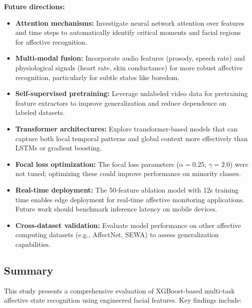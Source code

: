\textbf{Future directions:}
\begin{itemize}
    \item \textbf{Attention mechanisms:} Investigate neural network attention over features and time steps to automatically identify critical moments and facial regions for affective recognition.

    \item \textbf{Multi-modal fusion:} Incorporate audio features (prosody, speech rate) and physiological signals (heart rate, skin conductance) for more robust affective recognition, particularly for subtle states like boredom.

    \item \textbf{Self-supervised pretraining:} Leverage unlabeled video data for pretraining feature extractors to improve generalization and reduce dependence on labeled datasets.

    \item \textbf{Transformer architectures:} Explore transformer-based models that can capture both local temporal patterns and global context more effectively than LSTMs or gradient boosting.
    
    \item \textbf{Focal loss optimization:} The focal loss parameters ($\alpha=0.25$, $\gamma=2.0$) were not tuned; optimizing these could improve performance on minority classes.

    \item \textbf{Real-time deployment:} The 50-feature ablation model with 12s training time enables edge deployment for real-time affective monitoring applications. Future work should benchmark inference latency on mobile devices.
    
    \item \textbf{Cross-dataset validation:} Evaluate model performance on other affective computing datasets (e.g., AffectNet, SEWA) to assess generalization capabilities.
\end{itemize}

\subsection{Summary}
\label{sec:summary}

This study presents a comprehensive evaluation of XGBoost-based multi-task affective state recognition using engineered facial features. Key findings include:

